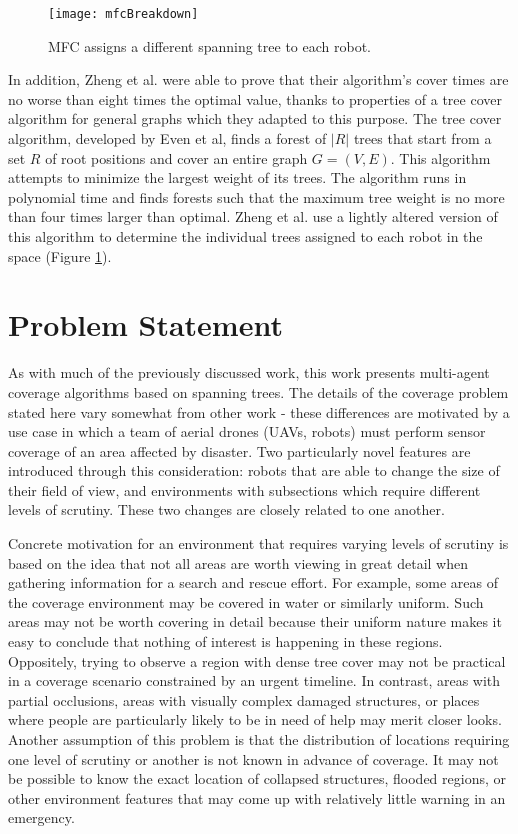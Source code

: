 \begin{figure}[H]
\texttt{[image: mfcBreakdown]}
\caption[Multi-Robot Forest Coverage Path Creation]{MFC assigns a different spanning tree to each robot.}
\label {fig:MRCPaths}
\end{figure}

In addition, Zheng et al. were able to prove that their algorithm's cover times are no worse than eight times the optimal value, thanks to properties of a tree cover algorithm for general graphs which they adapted to this purpose. The tree cover algorithm, developed by Even et al, finds a forest of $|R|$ trees that start from a set $R$ of root positions and cover an entire graph $G = (V, E)$. This algorithm attempts to minimize the largest weight of its trees. The algorithm runs in polynomial time and finds forests such that the maximum tree weight is no more than four times larger than optimal. Zheng et al. use a lightly altered version of this algorithm to determine the individual trees assigned to each robot in the space (Figure \ref{fig:MRCPaths}). 

\section{Problem Statement}

As with much of the previously discussed work, this work presents multi-agent coverage algorithms based on spanning trees. The details of the coverage problem stated here vary somewhat from other work - these differences are motivated by a use case in which a team of aerial drones (UAVs, robots) must perform sensor coverage of an area affected by disaster. Two particularly novel features are introduced through this consideration: robots that are able to change the size of their field of view, and environments with subsections which require different levels of scrutiny. These two changes are closely related to one another.

Concrete motivation for an environment that requires varying levels of scrutiny is based on the idea that not all areas are worth viewing in great detail when gathering information for a search and rescue effort. For example, some areas of the coverage environment may be covered in water or similarly uniform. Such areas may not be worth covering in detail because their uniform nature makes it easy to conclude that nothing of interest is happening in these regions. Oppositely, trying to observe a region with dense tree cover may not be practical in a coverage scenario constrained by an urgent timeline. In contrast, areas with partial occlusions, areas with visually complex damaged structures, or places where people are particularly likely to be in need of help may merit closer looks. Another assumption of this problem is that the distribution of locations requiring one level of scrutiny or another is not known in advance of coverage. It may not be possible to know the exact location of collapsed structures, flooded regions, or other environment features that may come up with relatively little warning in an emergency.

